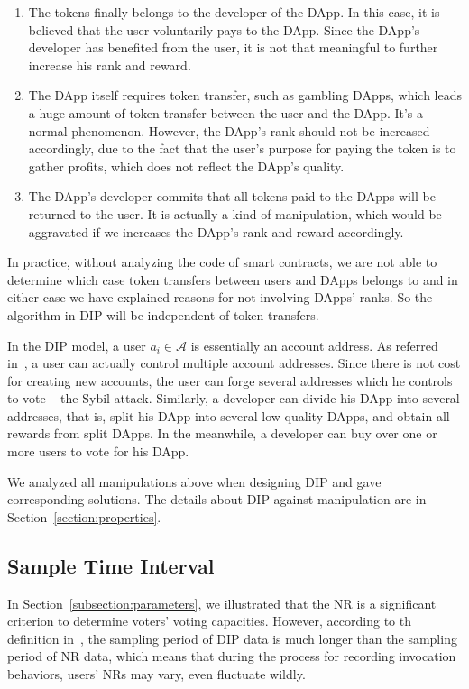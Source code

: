   \begin{enumerate}
  	 \item The tokens finally belongs to the developer of the DApp. In this case, it is believed that the user voluntarily pays to the DApp. Since the DApp's developer has benefited from the user, it is not that meaningful to further increase his rank and reward.
  	\item The DApp itself requires token transfer, such as gambling DApps, which leads  a huge amount of token transfer between the user and the DApp. It's a normal phenomenon. However, the DApp's rank should not be increased accordingly, due to the fact that the user's purpose for paying the token is to gather profits, which does not reflect the DApp's quality.
   \item The DApp's developer commits that all tokens paid to the DApps will be returned to the user. It is actually a kind of manipulation, which would be aggravated if we increases the DApp's rank and reward accordingly.
  \end{enumerate}
  In practice, without analyzing the code of smart contracts, we are not able to determine which case token transfers between users and DApps belongs to and in either case we have explained reasons for not involving DApps' ranks. So the algorithm in DIP will be independent of token transfers.

  In the DIP model, a user $a_i \in \mathcal{A}$ is essentially an account address. As referred in~\cite{Nebulasyellowpaper}, a user can actually control multiple account addresses. Since there is not cost for creating new accounts, the user can forge several addresses which he controls to vote -- the Sybil attack. Similarly, a developer can divide his DApp into several addresses, that is, split his DApp into several low-quality DApps, and obtain all rewards from split DApps. In the meanwhile, a developer can buy over one or more users to vote for his DApp.

  We analyzed all manipulations above when designing DIP and gave corresponding solutions. The details about DIP against manipulation are in Section~\ref{section:properties}.

  \subsection{Sample Time Interval}
  \label{subsection:interval}
  In Section~\ref{subsection:parameters}, we illustrated that the NR is a significant criterion to determine voters' voting capacities. However, according to th definition in~\cite{Nebulasyellowpaper}, the sampling period of DIP data is much longer than the sampling period of NR data, which means that during the process for recording invocation behaviors, users' NRs may vary, even fluctuate wildly.

